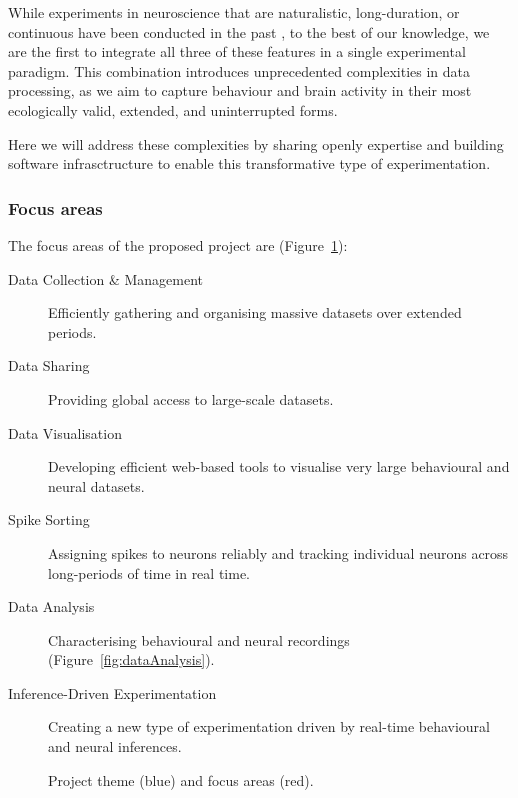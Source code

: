 While experiments in neuroscience that are naturalistic, long-duration, or
continuous have been conducted in the past
\citep[e.g.,][]{jhuangEtAl10,maoEtAl21,volohEtAl23}, to the best of our
knowledge, we are the first to integrate all three of these features in a
single experimental paradigm.
%
This combination introduces unprecedented complexities in data processing, as
we aim to capture behaviour and brain activity in their most ecologically valid,
extended, and uninterrupted forms.

Here we will address these complexities by sharing openly expertise
and building software infrasctructure to enable this transformative type of
experimentation.

\subsubsection{Focus areas}

The focus areas of the proposed project are (Figure~\ref{fig:focusAreas}):

\begin{description}

    \item[Data Collection \& Management] Efficiently gathering and organising
        massive datasets over extended periods.

    \item[Data Sharing] Providing global access to large-scale datasets.

    \item[Data Visualisation] Developing efficient web-based tools to visualise
        very large behavioural and neural datasets.

    \item[Spike Sorting] Assigning spikes to neurons reliably and tracking
        individual neurons across long-periods of time in real time.

    \item[Data Analysis] Characterising behavioural and neural recordings
        (Figure~\ref{fig:dataAnalysis}).

    \item[Inference-Driven Experimentation] Creating a new type of
        experimentation driven by real-time behavioural and neural inferences.

\end{description}

\begin{figure}
    \begin{center}
        \resizebox{4.0in}{!}{%
            
        }
    \end{center}
    \caption{Project theme (blue) and focus areas (red).}
    \label{fig:focusAreas}
\end{figure}

